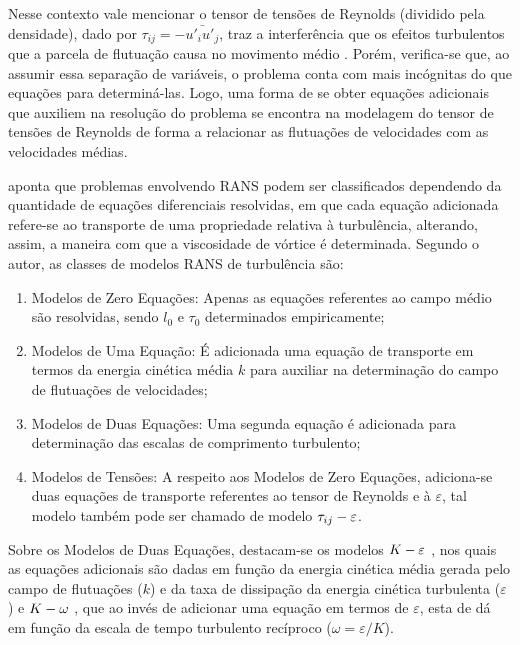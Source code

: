 Nesse contexto vale mencionar o tensor de tensões de Reynolds (dividido pela densidade), dado por $\tau_{ij}=-\bar{u'_iu'_j}$, traz a interferência que os efeitos turbulentos que a parcela de flutuação causa no movimento médio \cite{chou1945velocity,alfonsi2009reynolds}. Porém, verifica-se que, ao assumir essa separação de variáveis, o problema conta com mais incógnitas do que equações para determiná-las. Logo, uma forma de se obter equações adicionais que auxiliem na resolução do problema se encontra na modelagem do tensor de tensões de Reynolds de forma a relacionar as flutuações de velocidades com as velocidades médias.

 aponta que problemas envolvendo RANS podem ser classificados dependendo da quantidade de equações diferenciais resolvidas, em que cada equação adicionada refere-se ao transporte de uma propriedade relativa à turbulência, alterando, assim, a maneira com que a viscosidade de vórtice é determinada. Segundo o autor, as classes de modelos RANS de turbulência são:

\begin{enumerate}[label=\alph*.]
    \item Modelos de Zero Equações: Apenas as equações referentes ao campo médio são resolvidas, sendo $l_0$ e $\tau_0$ determinados empiricamente;
    \item Modelos de Uma Equação: É adicionada uma equação de transporte em termos da energia cinética média $k$ para auxiliar na determinação do campo de flutuações de velocidades;
    \item Modelos de Duas Equações: Uma segunda equação é adicionada para determinação das escalas de comprimento turbulento;
    \item Modelos de Tensões: A respeito aos Modelos de Zero Equações, adiciona-se duas equações de transporte referentes ao tensor de Reynolds e à $\varepsilon$, tal modelo também pode ser chamado de modelo $\tau_{ij}-\varepsilon$.
\end{enumerate}

Sobre os Modelos de Duas Equações, destacam-se os modelos $K-\varepsilon$ \cite{haakansson2012experimental,davidson2014pans,parente2011improved}, nos quais as equações adicionais são dadas em função da energia cinética média gerada pelo campo de flutuações ($k$) e da taxa de dissipação da energia cinética turbulenta ($\varepsilon$) e $K-\omega$ \cite{larsen2018over,bassi2005discontinuous}, que ao invés de adicionar uma equação em termos de $\varepsilon$, esta de dá em função da escala de tempo turbulento recíproco ($\omega=\varepsilon/K$).

